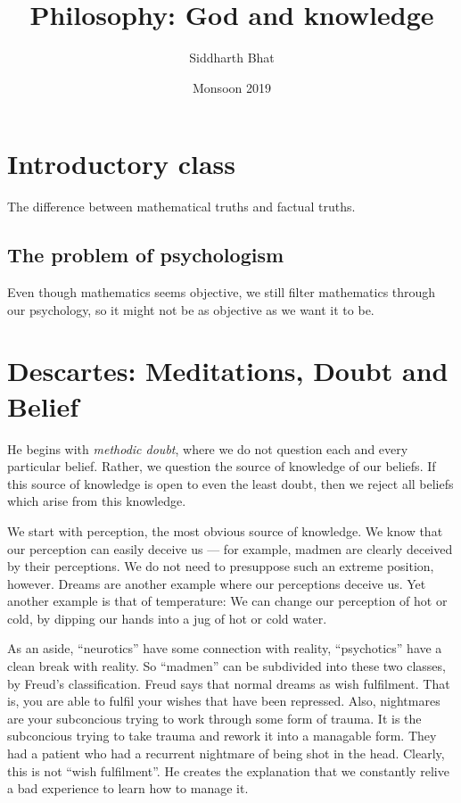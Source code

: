 \documentclass[11pt]{book}
\title{Philosophy: God and knowledge}
\author{Siddharth Bhat}
\date{Monsoon 2019}
\begin{document}
\maketitle
\tableofcontents

\chapter{Introductory class}

The difference between mathematical truths and factual truths.

\section{The problem of psychologism}

Even though mathematics seems objective, we still filter
mathematics through our psychology, so it might not be
as objective as we want it to be.

\chapter{Descartes: Meditations, Doubt and Belief}

He begins with \textit{methodic doubt}, where we do not question each and
every particular belief. Rather, we question the source of knowledge of our
beliefs. If this source of knowledge is open to even the least doubt, then 
we reject all beliefs which arise from this knowledge.

We start with perception, the most obvious source of knowledge. We know that
our perception can easily deceive us --- for example, madmen are clearly
deceived by their perceptions. We do not need to presuppose such an
extreme position, however. Dreams are another example where our perceptions
deceive us. Yet another example is that of temperature: We can
change our perception of hot or cold, by dipping our hands into a
jug of hot or cold water.

As an aside, ``neurotics'' have some connection with reality, ``psychotics''
have a clean break with reality. So ``madmen'' can be subdivided into
these two classes, by Freud's classification. Freud says that normal
dreams as wish fulfilment. That is, you are able to fulfil your wishes
that have been repressed. Also, nightmares are your subconcious
trying to work through some form of trauma. It is the subconcious
trying to take trauma and rework it into a managable form. They
had a patient who had a recurrent nightmare of being shot
in the head. Clearly, this is not ``wish fulfilment''.
He creates the explanation that we constantly relive a bad
experience to learn how to manage it.
\end{document}
